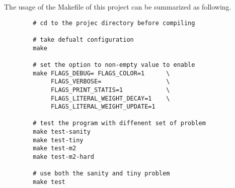 \documentclass[a4paper, 11.5pt]{article}
\begin{document}
\begin{multicols}{2}
    The usage of the Makefile of this project can be summarized as following.
    \\ 

    \begin{tcolorbox}[breakable, blanker, width=\linewidth]
      \begin{verbatim}
        # cd to the projec directory before compiling

        # take defualt configuration
        make

        # set the option to non-empty value to enable 
        make FLAGS_DEBUG= FLAGS_COLOR=1      \
             FLAGS_VERBOSE=                  \
             FLAGS_PRINT_STATIS=1            \
             FLAGS_LITERAL_WEIGHT_DECAY=1    \
             FLAGS_LITERAL_WEIGHT_UPDATE=1 

        # test the program with diffenent set of problem
        make test-sanity
        make test-tiny
        make test-m2
        make test-m2-hard

        # use both the sanity and tiny problem
        make test
      \end{verbatim}
    \end{tcolorbox}


\end{multicols}
\end{document}
